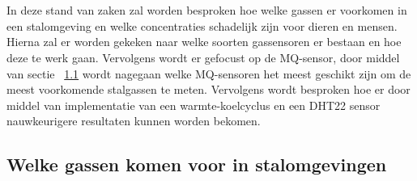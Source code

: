 \chapter{}%
\label{ch:stand-van-zaken}



In deze stand van zaken zal worden besproken hoe welke gassen er voorkomen in een stalomgeving en welke concentraties schadelijk zijn voor dieren en mensen. Hierna zal er worden gekeken naar welke soorten gassensoren er bestaan en hoe deze te werk gaan. Vervolgens wordt er gefocust op de MQ-sensor, door middel van sectie ~\ref{sec:welke-stalgassen} wordt nagegaan welke MQ-sensoren het meest geschikt zijn om de meest voorkomende stalgassen te meten. Vervolgens wordt besproken hoe er door middel van implementatie van een warmte-koelcyclus en een DHT22 sensor nauwkeurigere resultaten kunnen worden bekomen.


\section{Welke gassen komen voor in stalomgevingen}%
\label{sec:welke-stalgassen}

